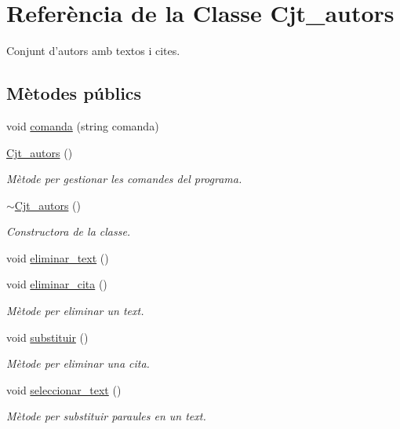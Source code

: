 \hypertarget{class_cjt__autors}{\section{Referència de la Classe Cjt\+\_\+autors}
\label{class_cjt__autors}
}


Conjunt d'autors amb textos i cites.  


\subsection*{Mètodes públics}
\begin{DoxyCompactItemize}
\item 
void \hyperlink{class_cjt__autors_a0fb9864fd22881216650552d0697e52d}{comanda} (string comanda)
\item 
\hyperlink{class_cjt__autors_a7ecfc670f529e537c255693f847a8466}{Cjt\+\_\+autors} ()
\begin{DoxyCompactList}\small\item\em Mètode per gestionar les comandes del programa. \end{DoxyCompactList}\item 
\hyperlink{class_cjt__autors_a157ba520241307b0e7156d620b167a04}{$\sim$\+Cjt\+\_\+autors} ()
\begin{DoxyCompactList}\small\item\em Constructora de la classe. \end{DoxyCompactList}\item 
void \hyperlink{class_cjt__autors_a171709e9426f62ecdcd1eba359965028}{eliminar\+\_\+text} ()
\item 
void \hyperlink{class_cjt__autors_a5811a00943aea93a50098d7c2053b9a8}{eliminar\+\_\+cita} ()
\begin{DoxyCompactList}\small\item\em Mètode per eliminar un text. \end{DoxyCompactList}\item 
void \hyperlink{class_cjt__autors_a7033452c9f98edee600a39022dd23c4a}{substituir} ()
\begin{DoxyCompactList}\small\item\em Mètode per eliminar una cita. \end{DoxyCompactList}\item 
void \hyperlink{class_cjt__autors_a5b975fe803a82fe99de5e92e32bcd681}{seleccionar\+\_\+text} ()
\begin{DoxyCompactList}\small\item\em Mètode per substituir paraules en un text. \end{DoxyCompactList}\item 

\end{DoxyCompactItemize}
